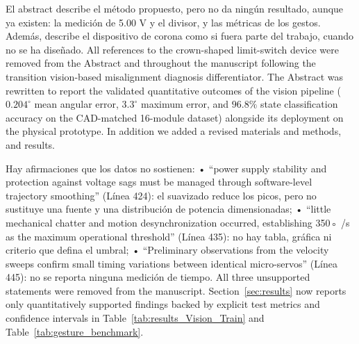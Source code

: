 \documentclass{LabDSTresponse}
\begin{document}
	
	
	{El abstract describe el método propuesto, pero no da ningún resultado, aunque ya existen: la medición de 5.00 V y el divisor,
		y las métricas de los gestos. Además, describe el dispositivo de corona como si fuera parte del trabajo, cuando no se ha
		diseñado.}
	{All references to the crown-shaped limit-switch device were removed from the Abstract and throughout the manuscript following the transition vision-based misalignment diagnosis differentiator. The Abstract was rewritten to report the validated quantitative outcomes of the vision pipeline ($0.204^\circ$ mean angular error, $3.3^\circ$ maximum error, and $96.8\%$ state classification accuracy on the CAD-matched 16-module dataset) alongside its deployment on the physical prototype. In addition we added a revised materials and methods, and results.}
	
	{Hay afirmaciones que los datos no sostienen:
		• “power supply stability and protection against voltage sags must be managed through software-level trajectory
		smoothing” (Línea 424): el suavizado reduce los picos, pero no sustituye una fuente y una distribución de potencia dimensionadas;
		• “little mechanical chatter and motion desynchronization occurred, establishing 350◦
		/s as the maximum operational
		threshold” (Línea 435): no hay tabla, gráfica ni criterio que defina el umbral;
		• “Preliminary observations from the velocity sweeps confirm small timing variations between identical micro-servos”
		(Línea 445): no se reporta ninguna medición de tiempo.}
	{All three unsupported statements were removed from the manuscript. Section~\ref{sec:results} now reports only quantitatively supported findings backed by explicit test metrics and confidence intervals in Table~\ref{tab:results_Vision_Train} and Table~\ref{tab:gesture_benchmark}.}
	
	
\end{document}
